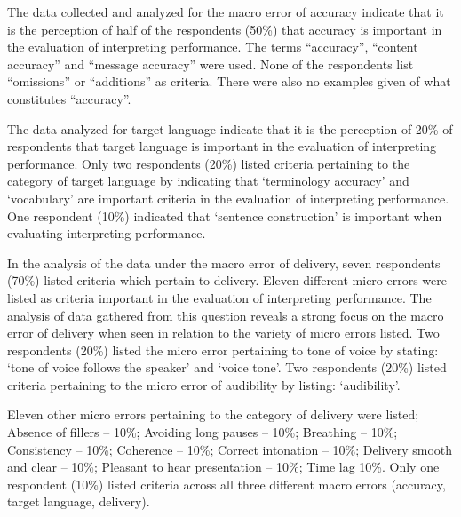 \documentclass[output=paper]{langsci/langscibook}
\begin{document}
The data collected and analyzed for the macro error of accuracy indicate that it is the perception of half of the respondents (50\%) that accuracy is important in the evaluation of interpreting performance. The terms “accuracy”, “content accuracy” and “message accuracy” were used. None of the respondents list “omissions” or “additions” as criteria. There were also no examples given of what constitutes “accuracy”.  

The data analyzed for target language indicate that it is the perception of 20\% of respondents that target language is important in the evaluation of interpreting performance. Only two respondents (20\%) listed criteria pertaining to the category of target language by indicating that ‘terminology accuracy’ and ‘vocabulary’ are important criteria in the evaluation of interpreting performance. One respondent (10\%) indicated that ‘sentence construction’ is important when evaluating interpreting performance. 

In the analysis of the data under the macro error of delivery, seven respondents (70\%) listed criteria which pertain to delivery. Eleven different micro errors were listed as criteria important in the evaluation of interpreting performance. The analysis of data gathered from this question reveals a strong focus on the macro error of delivery when seen in relation to the variety of micro errors listed. Two respondents (20\%) listed the micro error pertaining to tone of voice by stating: ‘tone of voice follows the speaker’ and ‘voice tone’. Two respondents (20\%) listed criteria pertaining to the micro error of audibility by listing: ‘audibility’. 

Eleven other micro errors pertaining to the category of delivery were listed; Absence of fillers – 10\%; Avoiding long pauses – 10\%; Breathing – 10\%; Consistency – 10\%; Coherence – 10\%; Correct intonation – 10\%; Delivery smooth and clear – 10\%; Pleasant to hear presentation – 10\%; Time lag 10\%. Only one respondent (10\%) listed criteria across all three different macro errors (accuracy, target language, delivery).
\end{document}
